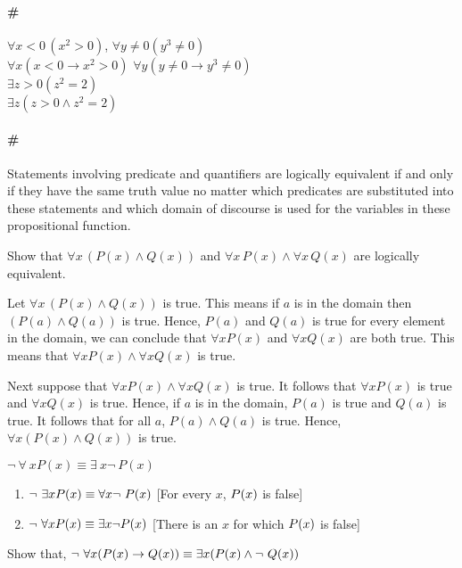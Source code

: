 \documentclass[../main-sheet.tex]{subfiles}
\begin{document}
\paragraph{\#}\(\forall x<0\,(x^2>0)\), \(\forall y\neq 0(y^3\neq 0)\)\\
\(\forall x (x<0 \rightarrow x^2>0)\) \(\forall y (y\neq 0\rightarrow y^3\neq0)\)\\
\(\exists z>0(z^2=2)\)\\\(\exists z (z>0\wedge z^2=2)\)
\paragraph{\#} Statements involving predicate and quantifiers are logically equivalent if and only if they have the same truth value no matter which predicates are substituted into these statements and which domain of discourse is used for the variables in these propositional function.
\begin{prob}
    Show that \(\forall x\,(P(x)\wedge Q(x))\) and \(\forall x\,P(x)\wedge \forall x\,Q(x)\) are logically equivalent.
\end{prob}
\begin{soln}
    Let \(\forall x\,(P(x)\wedge Q(x))\) is true. This means if $ a $ is in the domain then \((P(a)\wedge Q(a))\) is true. Hence, \(P(a)\) and \(Q(a)\) is true for every element in the domain, we can conclude that \(\forall xP(x)\) and \(\forall xQ(x)\) are both true. This means that \(\forall xP(x)\wedge\forall x Q(x)\) is true.

    Next suppose that \(\forall xP(x)\wedge\forall x Q(x)\) is true. It follows that \(\forall xP(x)\) is true and \(\forall xQ(x)\) is true.
    Hence, if $ a $ is in the domain, \(P(a)\) is true and \(Q(a)\) is true. It follows that for all $ a $, \(P(a)\wedge  Q(a)\) is true. Hence, \(\forall x(P(x)\wedge Q(x))\) is true.
\end{soln}
\(\neg\ \forall\ xP(x)\equiv\exists\ x\neg\ P(x)\)
\begin{enumerate}
    \item \( \neg\ \exists x P(x) \equiv \forall x \neg\ P(x)\) [For every $ x $, $ P(x) $ is false]
    \item \(\neg\ \forall xP(x) \equiv\exists x\neg P(x)\) [There is an $ x $ for which $ P(x) $ is false]
\end{enumerate}
\begin{prob}
    Show that, \(\neg\ \forall x(P(x)\to Q(x))\equiv\exists x(P(x)\wedge\neg\ Q(x))\)
\end{prob}
\end{document}
